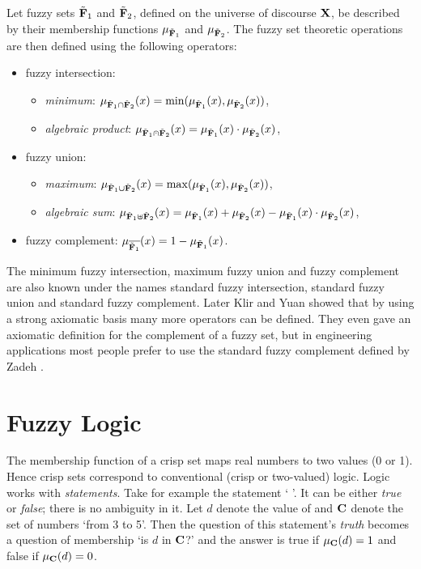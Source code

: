 \begin{defn}
Let fuzzy sets ${\tilde{{\mathbf{F}}}}_1$ and ${\tilde{{\mathbf{F}}}}_2$, defined on the universe of discourse ${\mathbf{X}}$, be described by their membership functions $\mu_{{\tilde{{\mathbf{F}}}}_1}$ and $\mu_{{\tilde{{\mathbf{F}}}}_2}$. The fuzzy set theoretic operations are then defined using the following operators:

\begin{itemize}
\item fuzzy intersection:
  \begin{itemize}
    \item \emph{minimum}:  $\mu_{{\tilde{{\mathbf{F}}}}_1 \cap {\ensuremath{\tilde{{\mathbf{F}}}}}_2}(x)=\min(\mu_{{\tilde{{\mathbf{F}}}}_1}(x),\mu_{{\tilde{{\mathbf{F}}}}_2}(x))$,
    \item {\em algebraic product\/}:  $\mu_{\fset{F}_1 \aprod \fset{F}_2}(x)=\mu_{\fset{F}_1}(x)\cdot\mu_{\fset{F}_2}(x)$,
  \end{itemize}

\item fuzzy union:
  \begin{itemize}
    \item {\em maximum\/}:  $\mu_{{\tilde{{\mathbf{F}}}}_1 \cup {\ensuremath{\tilde{{\mathbf{F}}}}}_2}(x)=\max(\mu_{{\tilde{{\mathbf{F}}}}_1}(x),\mu_{{\tilde{{\mathbf{F}}}}_2}(x))$,
    \item {\em algebraic sum\/}:  $\mu_{{\tilde{{\mathbf{F}}}}_1 \uplus {\ensuremath{\tilde{{\mathbf{F}}}}}_2}(x)=\mu_{{\tilde{{\mathbf{F}}}}_1}(x)+\mu_{{\tilde{{\mathbf{F}}}}_2}(x)-\mu_{{\tilde{{\mathbf{F}}}}_1}(x)\cdot\mu_{{\tilde{{\mathbf{F}}}}_2}(x)$,
  \end{itemize}

\item fuzzy complement:  
  $\mu_{\overline{{\tilde{{\mathbf{F}}}}_1}}(x)=1-\mu_{{\tilde{{\mathbf{F}}}}_1}(x)$.

\end{itemize}
\end{defn}

The minimum fuzzy intersection, maximum fuzzy union and fuzzy complement are also known under the names standard fuzzy intersection, standard fuzzy union and standard fuzzy complement. Later Klir and Yuan \cite{klir:1995} showed that by using a strong axiomatic basis many more operators can be defined. They even gave an axiomatic definition for the complement of a fuzzy set, but in engineering applications most people prefer to use the standard fuzzy complement defined by Zadeh \cite{zadeh:1965}.  


\section{Fuzzy Logic}
\label{sec:fuzzyModelling:fuzzyLogic}
The membership function of a crisp set maps real numbers to two values (0 or 1). Hence crisp sets correspond to conventional (crisp or two-valued) logic. Logic works with \emph{statements}. Take for example the statement `  '. It can be either \emph{true} or \emph{false}; there is no ambiguity in it. Let $d$ denote the value of  and ${\mathbf{C}}$ denote the set of numbers `from 3 to 5'. Then the question of this statement's \emph{truth} becomes a question of membership `is $d$ in ${\mathbf{C}}$?' and the answer is true if $\mu_{\mathbf{C}}(d)=1$ and false if $\mu_{\mathbf{C}}(d)=0$. 

